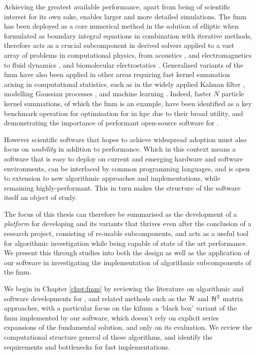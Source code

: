 Achieving the greatest available performance, apart from being of scientific interest for its own sake, enables larger and more detailed simulations. The \acrshort{fmm} has been deployed as a core numerical method in the solution of elliptic  when formulated as boundary integral equations in combination with iterative methods, therefore acts as a crucial subcomponent in derived solvers applied to a vast array of problems in computational physics, from acoustics \cite{hao2015efficient}, and electromagnetics \cite{darve2004fast} to fluid dynamics \cite{darve2004fast}, and biomolecular electrostatics \cite{yokota2011biomolecular, wang2021high}. Generalised variants of the \acrshort{fmm} have also been applied in other areas requiring fast kernel summation arising in computational statistics, such as in the widely applied Kalman filter \cite{li2014kalman}, modelling Gaussian processes \cite{ambikasaran2014fast}, and machine learning \cite{gray2000n, march2017far}. Indeed, faster $N$ particle kernel summations, of which the \acrshort{fmm} is an example, have been identified as a key benchmark operation for optimisation for in \acrshort{hpc} \cite{asanovic2006landscape} due to their broad utility, and demonstrating the importance of performant open-source software for .

However scientific software that hopes to achieve widespread adoption must also focus on \textit{usability} in addition to performance. Which in this context means a software that is easy to deploy on current and emerging hardware and software environments, can be interfaced by common programming languages, and is open to extension to new algorithmic approaches and implementations, while remaining highly-performant. This in turn makes the structure of the software itself an object of study.

The focus of this thesis can therefore be summarised as the development of a \textit{platform} for developing  and its variants that thrives even after the conclusion of a research project, consisting of re-usable subcomponents, and acts as a useful tool for algorithmic investigation while being capable of state of the art performance. We present this through studies into both the design as well as the application of our software in investigating the implementation of algorithmic subcomponents of the \acrshort{fmm}.

We begin in Chapter \ref{chpt:fmm} by reviewing the literature on algorithmic and software developments for , and related methods such as the $\mathcal{H}$ and $\mathcal{H}^2$ matrix approaches, with a particular focus on the \acrfull{kifmm} a `black box' variant of the \acrshort{fmm} implemented by our software, which doesn't rely on explicit series expansions of the fundamental solution, and only on its evaluation. We review the computational structure general of these algorithms, and identify the requirements and bottlenecks for fast implementations.

